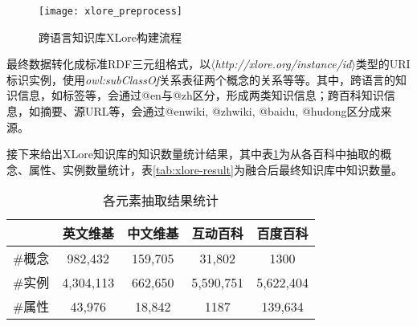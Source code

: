 \begin{figure}[ht]
  \centering
  \texttt{[image: xlore\_preprocess]}
  \caption{跨语言知识库XLore构建流程}
  \label{fig:xlore-preprocess}
\end{figure}

最终数据转化成标准RDF三元组格式，以$\langle$\emph{http://xlore.org/instance/id}$\rangle$类型的URI 标识实例，使用\textit{owl:subClassOf}关系表征两个概念的关系等等。其中，跨语言的知识信息，如标签等，会通过@en与@zh区分，形成两类知识信息；跨百科知识信息，如摘要、源URL等，会通过@enwiki, @zhwiki, @baidu, @hudong区分成来源。

接下来给出XLore知识库的知识数量统计结果，其中表\ref{tab:extract-result}为从各百科中抽取的概念、属性、实例数量统计，表\ref{tab:xlore-result}为融合后最终知识库中知识数量。

\begin{table}[htb]
  \centering
  \caption{各元素抽取结果统计}
  \label{tab:extract-result}
    \begin{tabular}{ccccc}
      \toprule[1.5pt]
         & 英文维基    & 中文维基   & 互动百科    & 百度百科  \\ \midrule[1pt]
        \#概念 & 982,432   & 159,705  & 31,802    & 1300      \\
        \#实例 & 4,304,113 & 662,650  & 5,590,751 & 5,622,404 \\
        \#属性 & 43,976    & 18,842   & 1187      & 139,634   \\
      \bottomrule[1.5pt]
    \end{tabular}
\end{table}


